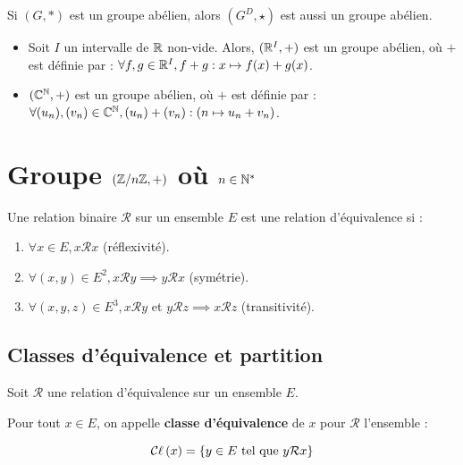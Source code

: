 \documentclass[12pt, a4paper]{report}
\begin{document}
\begin{remark}
    Si $(G,*)$ est un groupe abélien, alors $(G^D,\star)$ est aussi un groupe abélien.
\end{remark}

\begin{example}
    \begin{itemize}
        \item Soit $I$ un intervalle de $\mathbb{R}$ non-vide. Alors, $(\mathbb{R}^I,+)$ est un groupe abélien, où $+$ est définie par : $\forall f,g\in\mathbb{R}^I, f+g:x\mapsto f(x)+g(x)$.
        \item $(\mathbb{C}^{\mathbb{N}},+)$ est un groupe abélien, où $+$ est définie par : $\forall (u_n),(v_n)\in\mathbb{C}^{\mathbb{N}}, (u_n)+(v_n):(n\mapsto u_n+v_n)$. 
    \end{itemize}
\end{example}

\section{Groupe $(\mathbb{Z}/n\mathbb{Z},+)$ où $n\in\mathbb{N}^*$}

\begin{definition}
    Une relation binaire $\mathcal{R}$ sur un ensemble $E$ est une relation d'équivalence si :
    \begin{enumerate}
        \item $\forall x \in E, x \mathcal{R} x$ (réflexivité).
        \item $\forall (x,y) \in E^2, x \mathcal{R} y \implies y \mathcal{R} x$ (symétrie).
        \item $\forall (x,y,z) \in E^3, x \mathcal{R} y$ et $y \mathcal{R} z \implies x \mathcal{R} z$ (transitivité).
    \end{enumerate}
\end{definition}

\subsection{Classes d'équivalence et partition}

\begin{definition}
    Soit $\mathcal{R}$ une relation d'équivalence sur un ensemble $E$.

    Pour tout $x \in E$, on appelle \textbf{classe d'équivalence} de $x$ pour $\mathcal{R}$ l'ensemble :

    $$\mathcal{C}\ell\left(x\right) = \{y \in E \text{ tel que } y \mathcal{R} x\}$$
\end{definition}
\end{document}
